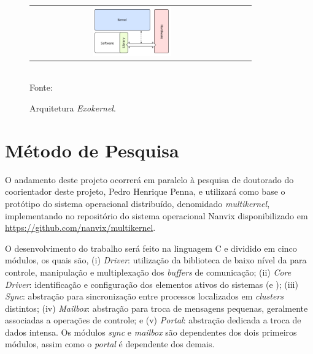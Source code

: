 \documentclass[
  12pt,       %
  openright,      %
  twoside,      %
  a4paper,      %
  english,      %
  brazil,       %
  ]{abntex2}
\begin{document}
        \begin{figure}[t]
          \begin{center}
              \caption{Arquitetura \textit{Exokernel}.}
                   \label{figexokernel}
            \begin{tabular}{ccc}
                  \includegraphics[width=0.4\textwidth]{figs/exokernel.png} \\
            \end{tabular}
                \vspace{1ex} \\
                Fonte: \cite{misc:exokernel}
            \end{center}
           \vspace{-2ex}
        \end{figure}

\chapter{Método de Pesquisa}
\label{cap:metodo-pesquisa}

    O andamento deste projeto ocorrerá em paralelo à pesquisa de doutorado do
    coorientador deste projeto, Pedro Henrique Penna, e utilizará como base o
    protótipo do sistema operacional distribuído, denomidado \textit{multikernel},
    implementando no repositório do sistema operacional Nanvix \cite{Penna2017,Penna2017-1}
    disponibilizado em \url{https://github.com/nanvix/multikernel}.
    
    O desenvolvimento do trabalho será feito na linguagem C e dividido em
    cinco módulos, os quais são,
    (i) \textit{\noc Driver}: utilização da biblioteca de baixo nível da \noc
    para controle, manipulação e multiplexação dos \textit{buffers} de comunicação;
    (ii) \textit{Core Driver}: identificação e configuração dos elementos ativos 
    do sistemas (\ioclusters e \cpclusters); 
    (iii) \textit{Sync}: abstração para sincronização entre processos localizados
    em \textit{clusters} distintos;
    (iv) \textit{Mailbox}: abstração para troca de mensagens pequenas, geralmente 
    associadas a operações de controle; e 
    (v) \textit{Portal}: abstração dedicada a troca de dados intensa. 
    Os módulos \textit{sync} e \textit{mailbox} são dependentes dos dois
    primeiros módulos, assim como o \textit{portal} é dependente dos demais.
    
\end{document}
